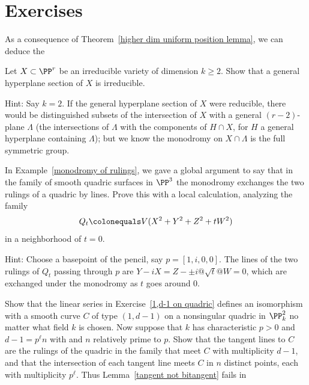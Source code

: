 \section{Exercises}

As a consequence of Theorem~\ref{higher dim uniform position lemma},
we can deduce the 
%

\begin{exercise}
Let $X \subset \PP^r$ be an irreducible variety of dimension $k \geq
2$. Show that a general hyperplane section of $X$ is irreducible.

Hint: Say $k=2$. If the general hyperplane section of $X$ were reducible,
there would be distinguished subsets of the intersection of $X$ with
a general $(r-2)$-plane $\Lambda$ (the intersections of $\Lambda$ with
the components of $H \cap X$, for $H$ a general hyperplane containing
$\Lambda$); but we know the monodromy on $X \cap \Lambda$ is the full
symmetric group.
\end{exercise}

\begin{exercise}
In Example~\ref{monodromy of rulings}, we gave a global argument to say
that in the family of smooth quadric surfaces in $\PP^3$ the monodromy
exchanges the two rulings of a quadric by lines. Prove this with a local
calculation, analyzing the family
$$
Q_t \colonequals  V(X^2+Y^2+Z^2 + tW^2)
$$
in a neighborhood of $t=0$.

Hint: Choose a basepoint of the pencil, say $p = [1, i, 0, 0]$. The
lines of the two rulings of $Q_t$ passing through $p$ are
$Y-iX = Z-\pm i@\sqrt{t}@W = 0$, which are exchanged under the monodromy
as $t$ goes around 0.
\end{exercise}

\begin{exercise}
\label{kaji}
Show that the linear series 
in Exercise~\ref{1,d-1 on quadric}
%
defines an isomorphism with a smooth curve $C$ of type $(1, d-1)$ on a
nonsingular quadric in $\PP^2_k$ no matter what field $k$ is chosen. Now
suppose that  $k$ has characteristic $p>0$ and $d-1 = p^\ell n$ with
and $n$ relatively prime to $p$.
Show that the tangent lines to $C$ are the rulings of the quadric in the
family that meet $C$ with multiplicity $d-1$, and that the intersection of
each tangent line meets $C$ in $n$ distinct points, each with multiplicity
$p^\ell$. Thus Lemma~\ref{tangent not bitangent}
fails in 
% 
\end{exercise}

